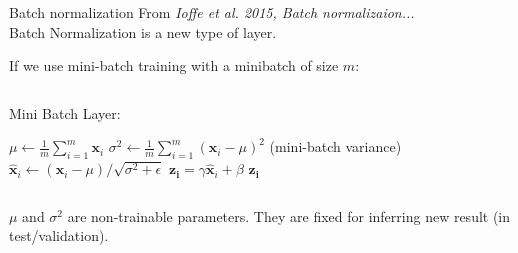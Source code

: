 \documentclass[handout]{beamer}
\begin{document}
    
\begin{frame}{Batch normalization}
From \textit{Ioffe et al. 2015, Batch normalizaion...}\\

Batch Normalization is a new type of layer.

If we use mini-batch training with a minibatch of size $m$:
\begin{columns}
\begin{footnotesize}
\begin{block}{Mini Batch Layer:}\end{block}
\renewcommand{\algorithmicrequire}{\textbf{Input:}}
\renewcommand{\algorithmicensure}{\textbf{Output:}}
    \begin{algorithmic}
    \State $\mu \leftarrow \frac{1}{m}\sum_{i=1}^m \mathbf{x}_i$ 
    \State $\sigma^2 \leftarrow \frac{1}{m}\sum_{i=1}^m \left( \mathbf{x}_i - \mu \right)^2$ \Comment (mini-batch variance)
    \State $\hat{\mathbf{x}}_i \leftarrow (\mathbf{x}_i - \mu) / \sqrt{\sigma^2 + \epsilon}$ 
    \State $\mathbf{z_i} = \gamma \hat{\mathbf{x}}_i + \beta $ 
    \State \Return $\mathbf{z_i}$
    \end{algorithmic}
    \end{footnotesize}

\end{columns}

$\mu$ and $\sigma^2$ are \alert{non-trainable parameters}. They are fixed for inferring new result (in test/validation).
\end{frame}
\end{document}
